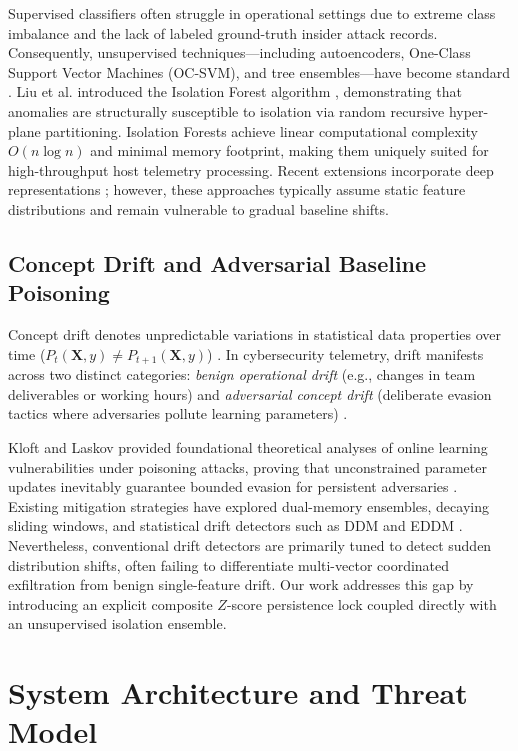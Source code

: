 \documentclass[conference]{IEEEtran}
\begin{document}
Supervised classifiers often struggle in operational settings due to extreme class imbalance and the lack of labeled ground-truth insider attack records. Consequently, unsupervised techniques---including autoencoders, One-Class Support Vector Machines (OC-SVM), and tree ensembles---have become standard \cite{b7}. Liu et al. introduced the Isolation Forest algorithm \cite{b4}, demonstrating that anomalies are structurally susceptible to isolation via random recursive hyper-plane partitioning. Isolation Forests achieve linear computational complexity $O(n \log n)$ and minimal memory footprint, making them uniquely suited for high-throughput host telemetry processing. Recent extensions incorporate deep representations \cite{b9}; however, these approaches typically assume static feature distributions and remain vulnerable to gradual baseline shifts.

\subsection{Concept Drift and Adversarial Baseline Poisoning}
Concept drift denotes unpredictable variations in statistical data properties over time ($P_t(\mathbf{X}, y) \neq P_{t+1}(\mathbf{X}, y)$) \cite{b5}. In cybersecurity telemetry, drift manifests across two distinct categories: \textit{benign operational drift} (e.g., changes in team deliverables or working hours) and \textit{adversarial concept drift} (deliberate evasion tactics where adversaries pollute learning parameters) \cite{b6}. 

Kloft and Laskov provided foundational theoretical analyses of online learning vulnerabilities under poisoning attacks, proving that unconstrained parameter updates inevitably guarantee bounded evasion for persistent adversaries \cite{b8}. Existing mitigation strategies have explored dual-memory ensembles, decaying sliding windows, and statistical drift detectors such as DDM and EDDM \cite{b5}. Nevertheless, conventional drift detectors are primarily tuned to detect sudden distribution shifts, often failing to differentiate multi-vector coordinated exfiltration from benign single-feature drift. Our work addresses this gap by introducing an explicit composite $Z$-score persistence lock coupled directly with an unsupervised isolation ensemble.

\section{System Architecture and Threat Model}
\end{document}
